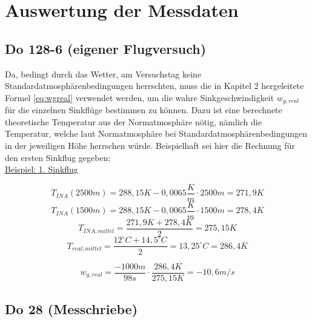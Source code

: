 \chapter{Auswertung der Messdaten}
\label{chapter:auswertung}

\section{Do 128-6 (eigener Flugversuch)}

Da, bedingt durch das Wetter, am Versuchstag keine Standardatmosphärenbedingungen herrschten, muss die in Kapitel 2 hergeleitete Formel \ref{eq:wgreal} verwendet werden, um die wahre Sinkgeschwindigkeit $w_{g,real}$ für die einzelnen Sinkflüge bestimmen zu können. Dazu ist eine berechnete theoretische Temperatur aus der Normatmosphäre nötig, nämlich die Temperatur, welche laut Normatmosphäre bei Standardatmosphärenbedingungen in der jeweiligen Höhe herrschen würde. Beispielhaft sei hier die Rechnung für den ersten Sinkflug gegeben:\\

\underline{Beispiel: 1. Sinkflug}

\begin{equation}
T_{INA}(2500m) = 288,15 K - 0,0065 \frac{K}{m} \cdot 2500m = 271,9 K
\end{equation}
\begin{equation}
T_{INA}(1500m) = 288,15 K - 0,0065 \frac{K}{m} \cdot 1500m = 278,4 K
\end{equation}
\begin{equation}
T_{INA,mittel} = \frac{271,9K + 278,4K}{2} = 275,15 K
\end{equation}
\begin{equation}
T_{real,mittel} = \frac{12^\circ C + 14,5^\circ C}{2} = 13,25^\circ C =	286,4 K
\end{equation}

\begin{equation}
w_{g,real} = \frac{-1000m}{98s} \cdot \frac{286,4K}{275,15K} = - 10,6m/s
\end{equation}


\section{Do 28 (Messchriebe)}

\newpage